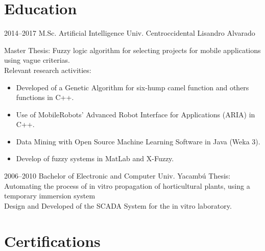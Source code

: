 \documentclass[a4paper,nocolors]{cv-friggeri-x}
\begin{document}
\section{Education}

\begin{entrylist}


\entry
{2014--2017}
{M.Sc. {\normalfont Artificial Intelligence}}
{Univ. Centroccidental Lisandro Alvarado}
{Master Thesis: Fuzzy logic algorithm for selecting projects for mobile applications using
vague criterias.\\
Relevant research activities:
\begin{itemize}
\item Developed of a Genetic Algorithm for six-hump camel function and others functions in C++.
\item Use of MobileRobots' Advanced Robot Interface for Applications (ARIA) in C++.
\item Data Mining with Open Source Machine Learning Software in Java (Weka 3).
\item Develop of fuzzy systems in MatLab and X-Fuzzy.
\end{itemize}
}


\entry
{2006--2010}
{Bachelor {\normalfont of Electronic and Computer}}
{Univ. Yacambú}
{Thesis: Automating the process of in vitro propagation of horticultural plants, using a
temporary immersion system\\
Design and Developed of the SCADA System for the in vitro laboratory.}


\end{entrylist}



\section{Certifications}
\end{document}

